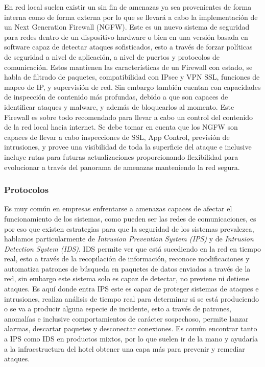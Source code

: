 \documentclass[10pt]{article}
\begin{document}
En red local suelen existir un sin fin de amenazas ya sea provenientes de forma interna como de forma externa por lo que se llevará a cabo la implementación de un Next Generation Firewall (NGFW). Este es un nuevo sistema de seguridad para redes dentro de un dispositivo hardware o bien en una versión basada en software capaz de detectar ataques sofisticados, esto a través de forzar políticas de seguridad a nivel de aplicación, a nivel de puertos y protocolos de comunicación.
Estos mantienen las características de un Firewall con estado, se habla de filtrado de paquetes, compatibilidad con IPsec y VPN SSL, funciones de mapeo de IP, y supervisión de red. Sin embargo también cuentan con capacidades de inspección de contenido más profundas, debido a que son capaces de identificar ataques y malware, y además de bloquearlos al momento. Este Firewall es sobre todo recomendado para llevar a cabo un control del contenido de la red local hacia internet. Se debe tomar en cuenta que los NGFW son capaces de llevar a cabo inspecciones de SSL, App Control, previsión de intrusiones, y provee una  visibilidad de toda la superficie del ataque e inclusive incluye rutas para futuras actualizaciones proporcionando flexibilidad para evolucionar a través del panorama de amenazas manteniendo la red segura.\cite{ref6}

\subsubsection{Protocolos}

Es muy común en empresas enfrentarse a amenazas capaces de afectar el funcionamiento de los sistemas, como pueden ser las redes de comunicaciones, es por eso que existen estrategias para que la seguridad de los sistemas prevalezca, hablamos particularmente de \emph{Intrusion Prevention System (IPS)} y de \emph{Intrusion Detection System (IDS)}. IDS permite ver que está sucediendo en la red en tiempo real, esto a través de la recopilación de información, reconoce modificaciones y automatiza patrones de búsqueda en paquetes de datos enviados a través de la red, sin embargo este sistema solo es capaz de detectar, no previene ni detiene ataques. Es aquí donde entra IPS este es capaz de proteger sistemas de ataques e intrusiones, realiza análisis de tiempo real para determinar si se está produciendo o se va a producir alguna especie de incidente, esto a través de patrones, anomalías e inclusive comportamientos de carácter sospechoso, permite lanzar alarmas, descartar paquetes y desconectar conexiones. Es común encontrar tanto a IPS como IDS en productos mixtos, por lo que suelen ir de la mano y ayudaría a la infraestructura del hotel obtener una capa más para prevenir y remediar ataques. \cite{ref5} 
\end{document}
